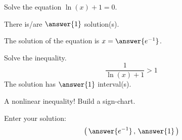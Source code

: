 \documentclass{ximera}
\author{Bobby Ramsey}
\begin{document}
\begin{exercise}
	Solve the equation $\ln(x) + 1 = 0$.

	There is/are $\answer{1}$ solution(s).
	\begin{exercise}
		The solution of the equation is $x = \answer{e^{-1}}$.
	

		\begin{exercise}
			Solve the inequality.
			\[ \frac{1}{\ln(x)+1} > 1 \]
			The solution has $\answer{1}$ interval(s).
			\begin{hint}
				A nonlinear inequality!  Build a sign-chart.
			\end{hint}
			\begin{exercise}
				Enter your solution:
				\[ \left( \, \answer{e^{-1}} \, , \, \answer{1} \, \right) \]
			\end{exercise}
		\end{exercise}
	\end{exercise}
\end{exercise}
\end{document}
